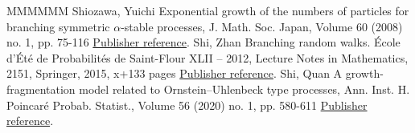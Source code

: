 \documentclass[11pt]{article}
\theoremstyle{definition}
\numberwithin{equation}{section}
\numberwithin{figure}{section}
\numberwithin{table}{section}
\begin{document}
\begin{thebibliography}{MMMMMM}
 Shiozawa, Yuichi Exponential growth of the numbers of particles for branching symmetric \(\alpha\)-stable processes, J. Math. Soc. Japan, Volume 60 (2008) no. 1, pp. 75-116 \href{https://ahl.centre-mersenne.org/item/AHL_2020__3__795_0/#Shio}{Publisher reference}.
 Shi, Zhan Branching random walks. École d’Été de Probabilités de Saint-Flour XLII – 2012, Lecture Notes in Mathematics, 2151, Springer, 2015, x+133 pages \href{https://ahl.centre-mersenne.org/item/AHL_2020__3__795_0/#Shi}{Publisher reference}.
 Shi, Quan A growth-fragmentation model related to Ornstein–Uhlenbeck type processes, Ann. Inst. H. Poincaré Probab. Statist., Volume 56 (2020) no. 1, pp. 580-611 \href{https://ahl.centre-mersenne.org/item/AHL_2020__3__795_0/#ShiQ-ou}{Publisher reference}.
\end{thebibliography}
\end{document}
